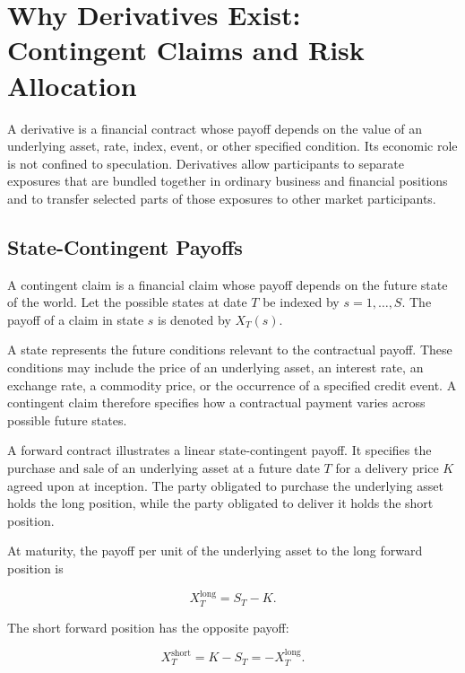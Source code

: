 \section[Why Derivatives Exist: Contingent Claims and Risk Allocation]{Why Derivatives Exist:\\ Contingent Claims and Risk Allocation}

A derivative is a financial contract whose payoff depends on the value of an underlying asset, rate, index, event, or other specified condition. Its economic role is not confined to speculation. Derivatives allow participants to separate exposures that are bundled together in ordinary business and financial positions and to transfer selected parts of those exposures to other market participants.

\subsection{State-Contingent Payoffs}

A contingent claim is a financial claim whose payoff
depends on the future state of the world. Let the
possible states at date $T$ be indexed by
$s=1,\ldots,S$. The payoff of a claim in state $s$
is denoted by $X_T(s)$.

A state represents the future conditions relevant
to the contractual payoff. These conditions may
include the price of an underlying asset, an interest
rate, an exchange rate, a commodity price, or the
occurrence of a specified credit event. A contingent
claim therefore specifies how a contractual payment
varies across possible future states.

A forward contract illustrates a linear
state-contingent payoff. It specifies the purchase
and sale of an underlying asset at a future date $T$
for a delivery price $K$ agreed upon at inception.
The party obligated to purchase the underlying asset
holds the long position, while the party obligated
to deliver it holds the short position.

At maturity, the payoff per unit of the underlying
asset to the long forward position is

\begin{equation}
X_T^{\mathrm{long}}
=
S_T-K.
\label{eq:ch11-forward-long-payoff}
\end{equation}

The short forward position has the opposite payoff:

\begin{equation}
X_T^{\mathrm{short}}
=
K-S_T
=
-X_T^{\mathrm{long}}.
\label{eq:ch11-forward-short-payoff}
\end{equation}

